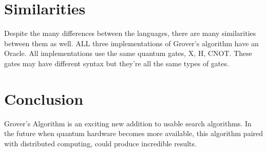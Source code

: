 \documentclass[conference]{IEEEtran}
\begin{document}
\section{Similarities}
Despite the many differences between the languages, there are many similarities between them as well. 
ALL three implementations of Grover's algorithm have an Oracle. 
All implementations use the same quantum gates, X, H, CNOT. 
These gates may have different syntax but they're all the same types of gates. 

\section{Conclusion}
Grover's Algorithm is an exciting new addition to usable search algorithms. 
In the future when quantum hardware becomes more available, this algorithm paired with distributed computing, could produce incredible results.
\end{document}
